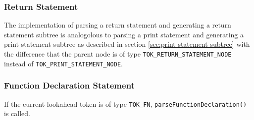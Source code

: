 \subsubsection{Return Statement}
The implementation of parsing a return statement and generating a return statement subtree is analogolous to parsing a print statement and generating a print statement subtree as described in section \ref{sec:print statement subtree} with the difference that the parent node is of type \verb!TOK_RETURN_STATEMENT_NODE! instead of \verb!TOK_PRINT_STATEMENT_NODE!.
\subsubsection{Function Declaration Statement}
\label{sec:function declaration statement}
If the current lookahead token is of type \verb!TOK_FN!, \verb!parseFunctionDeclaration()! is called. 

